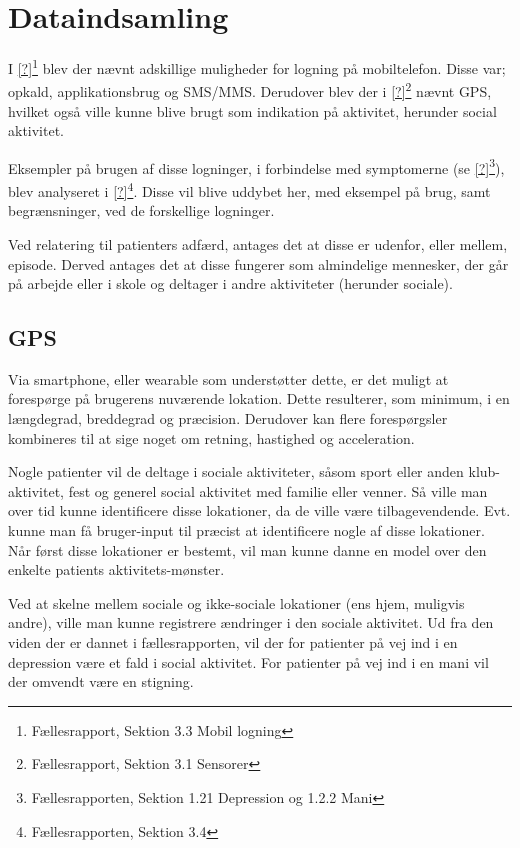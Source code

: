 \section{Dataindsamling}
I \cref{?}\footnote{Fællesrapport, Sektion 3.3 Mobil logning} blev der nævnt adskillige muligheder for logning på mobiltelefon.
Disse var; opkald, applikationsbrug og SMS/MMS.
Derudover blev der i \cref{?}\footnote{Fællesrapport, Sektion 3.1 Sensorer} nævnt GPS, hvilket også ville kunne blive brugt som indikation på aktivitet, herunder social aktivitet.

Eksempler på brugen af disse logninger, i forbindelse med symptomerne (se \cref{?}\footnote{Fællesrapporten, Sektion 1.21 Depression og 1.2.2 Mani}), blev analyseret i \cref{?}\footnote{Fællesrapporten, Sektion 3.4}.
Disse vil blive uddybet her, med eksempel på brug, samt begrænsninger, ved de forskellige logninger.

Ved relatering til patienters adfærd, antages det at disse er udenfor, eller mellem, episode.
Derved antages det at disse fungerer som almindelige mennesker, der går på arbejde eller i skole og deltager i andre aktiviteter (herunder sociale).

\subsection{GPS}
Via smartphone, eller wearable som understøtter dette, er det muligt at forespørge på brugerens nuværende lokation.
Dette resulterer, som minimum, i en længdegrad, breddegrad og præcision.
Derudover kan flere forespørgsler kombineres til at sige noget om retning, hastighed og acceleration.

Nogle patienter vil de deltage i sociale aktiviteter, såsom sport eller anden klub-aktivitet, fest og generel social aktivitet med familie eller venner.
Så ville man over tid kunne identificere disse lokationer, da de ville være tilbagevendende.
Evt. kunne man få bruger-input til præcist at identificere nogle af disse lokationer.
Når først disse lokationer er bestemt, vil man kunne danne en model over den enkelte patients aktivitets-mønster.

Ved at skelne mellem sociale og ikke-sociale lokationer (ens hjem, muligvis andre), ville man kunne registrere ændringer i den sociale aktivitet.
Ud fra den viden der er dannet i fællesrapporten, vil der for patienter på vej ind i en depression være et fald i social aktivitet.
For patienter på vej ind i en mani vil der omvendt være en stigning.

